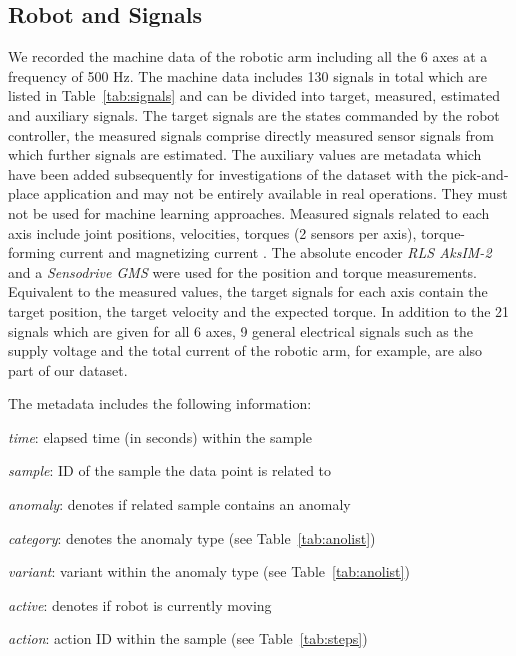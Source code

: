 \documentclass[journal]{IEEEtran}
\newenvironment{packed_enum}{
\begin{itemize}
  \setlength{\itemsep}{3pt}
  \setlength{\parskip}{0pt}
  \setlength{\parsep}{0pt}
}{\end{itemize}}
\begin{document}
\subsection{Robot and Signals}
\label{robot_signals}
We recorded the machine data of the robotic arm including all the 6 axes at a frequency of 500 Hz.
The machine data includes 130 signals in total which are listed in Table~\ref{tab:signals} and can be divided into target, measured, estimated and auxiliary signals.
The target signals are the states commanded by the robot controller, the measured signals comprise directly measured sensor signals from which further signals are estimated.
The auxiliary values are metadata which have been added subsequently for investigations of the dataset with the pick-and-place application and may not be entirely available in real operations.
They must not be used for machine learning approaches.
Measured signals related to each axis include joint positions, velocities, torques (2 sensors per axis), torque-forming current  {and magnetizing current }.
The absolute encoder \textit{RLS AksIM-2} and a \textit{Sensodrive GMS} were used for the position and torque measurements.
Equivalent to the measured values, the target signals for each axis contain the target position, the target velocity and the expected torque.
In addition to the 21 signals which are given for all 6 axes, 9 general electrical signals such as the supply voltage and the total current of the robotic arm, for example, are also part of our dataset.

The metadata includes the following information:
\begin{packed_enum}
    \item \textit{time}: elapsed time (in seconds) within the sample
    \item \textit{sample}: ID of the sample the data point is related to
    \item \textit{anomaly}: denotes if related sample contains an anomaly
    \item \textit{category}: denotes the anomaly type (see Table~\ref{tab:anolist})
    \item \textit{variant}: variant within the anomaly type (see Table~\ref{tab:anolist})
    \item \textit{active}: denotes if robot is currently moving
    \item \textit{action}: action ID within the sample (see Table~\ref{tab:steps})
\end{packed_enum}
\end{document}
